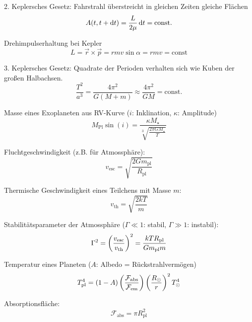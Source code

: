 \documentclass[a4paper,german,12pt,smallheadings,twocolumn]{scrartcl}
\begin{document}
2. Keplersches Gesetz: Fahrstrahl überstreicht in gleichen Zeiten gleiche
Flächen
\begin{equation}
  A(t, t + \dif t) = \frac{L}{2 \mu} \dif t = \text{const.}
\end{equation}

Drehimpulserhaltung bei Kepler
\begin{equation}
  L = \vec{r} \times \vec{p} = r m v \sin \alpha = r m v = \text{const}
\end{equation}

3. Keplersches Gesetz: Quadrate der Perioden verhalten sich wie Kuben der
großen Halbachsen.
\begin{equation}
  \frac{T^2}{a^3} = \frac{4 \pi^2}{G(M+m)} \approx \frac{4 \pi^2}{GM} = \text{const.}
\end{equation}

Masse eines Exoplaneten aus RV-Kurve ($i$: Inklination, $\kappa$: Amplitude)
\begin{equation}
  M_\text{Pl} \sin(i) = \frac{\kappa M_\star}{\sqrt[3]{\frac{2 \pi G M_\star}{T}}}
\end{equation}

Fluchtgeschwindigkeit (z.B. für Atmossphäre):
\begin{equation}
  v_\text{esc} = \sqrt{\frac{2 G m_\text{pl}}{R_\text{pl}}}
\end{equation}

Thermische Geschwindigkeit eines Teilchens mit Masse $m$:
\begin{equation}
  v_\text{th} = \sqrt{\frac{2 kT}{m}}
\end{equation}

Stabilitätsparameter der Atmossphäre ($\Gamma \ll 1$: stabil, $\Gamma \gg 1$:
instabil):
\begin{equation}
  \Gamma^2 = \del{\frac{v_\text{esc}}{v_\text{th}}}^2
  = \frac{kT R_\text{pl}}{G m_\text{pl} m}
\end{equation}

Temperatur eines Planeten ($A$: Albedo = Rückstrahlvermögen)
\begin{equation}
  T_\text{pl}^4 = (1-A) \del{
    \frac{\mathcal{F}_\text{abs}}{\mathcal{F}_\text{em}}
  } \del{
    \frac{R_\odot}{r}
  }^2 T_\odot^4
\end{equation}

Absorptionsfläche:
\begin{equation}
  \mathcal{F}_\text{abs} = \pi R_\text{pl}^2
\end{equation}
\end{document}
